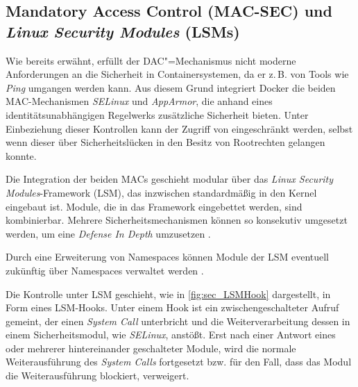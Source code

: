 \documentclass[../main.tex]{subfiles}
\begin{document}



    \subsection{Mandatory Access Control (\acrshort{MAC-SEC}) und \emph{Linux Security Modules} (\acrshort{LSM}s)}
		\label{lsm}
			Wie bereits erwähnt, erfüllt der DAC"=Mechanismus nicht moderne Anforderungen an die Sicherheit in Containersystemen, da er z.\,B. von Tools wie \emph{Ping} umgangen werden kann. Aus diesem Grund integriert Docker die beiden MAC-Mechanismen \emph{\acrshort{SELinux}} und \emph{\acrshort{AppArmor}}, die anhand eines identitätsunabhängigen Regelwerks zusätzliche Sicherheit bieten. Unter Einbeziehung dieser Kontrollen kann der Zugriff von \cbroken{} eingeschränkt werden, selbst wenn dieser über Sicherheitslücken in den Besitz von Rootrechten gelangen konnte.

			Die Integration der beiden MACs geschieht modular über das \emph{Linux Security Modules}-Framework (\acrshort{LSM}), das inzwischen standardmäßig in den Kernel eingebaut ist. Module, die in das Framework eingebettet werden, sind kombinierbar. Mehrere Sicherheitsmechanismen können so konsekutiv umgesetzt werden, um eine \emph{Defense In Depth} umzusetzen \cite[S.3]{LSMFramework}.

			Durch eine Erweiterung von Namespaces können Module der LSM eventuell zukünftig über Namespaces verwaltet werden \cite{nsHooksLSM}.

			Die Kontrolle unter LSM geschieht, wie in \fig \ref{fig:sec_LSMHook} dargestellt, in Form eines LSM-Hooks. Unter einem Hook ist ein zwischengeschalteter Aufruf gemeint, der einen \emph{System Call} unterbricht und die Weiterverarbeitung dessen in einem Sicherheitsmodul, wie \emph{\acrshort{SELinux}}, anstößt. Erst nach einer Antwort eines oder mehrerer hintereinander geschalteter Module, wird die normale Weiterausführung des \emph{System Calls} fortgesetzt bzw. für den Fall, dass das Modul die Weiterausführung blockiert, verweigert.
\end{document}
